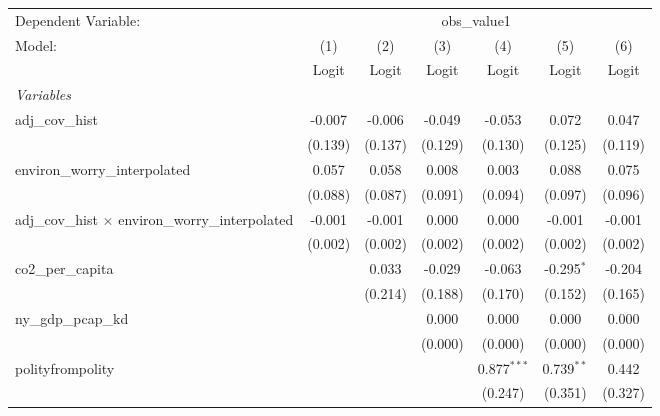 
\begingroup
\centering
\begin{tabular}{lcccccc}
   \toprule
   Dependent Variable: & \multicolumn{6}{c}{obs\_value1}\\
   Model:                                                    & (1)     & (2)     & (3)     & (4)           & (5)          & (6)\\  
                                                             &  Logit  & Logit   & Logit   & Logit         & Logit        & Logit\\  
   \midrule
   \emph{Variables}\\
   adj\_cov\_hist                                            & -0.007  & -0.006  & -0.049  & -0.053        & 0.072        & 0.047\\   
                                                             & (0.139) & (0.137) & (0.129) & (0.130)       & (0.125)      & (0.119)\\   
   environ\_worry\_interpolated                              & 0.057   & 0.058   & 0.008   & 0.003         & 0.088        & 0.075\\   
                                                             & (0.088) & (0.087) & (0.091) & (0.094)       & (0.097)      & (0.096)\\   
   adj\_cov\_hist $\times$ environ\_worry\_interpolated      & -0.001  & -0.001  & 0.000   & 0.000         & -0.001       & -0.001\\   
                                                             & (0.002) & (0.002) & (0.002) & (0.002)       & (0.002)      & (0.002)\\   
   co2\_per\_capita                                          &         & 0.033   & -0.029  & -0.063        & -0.295$^{*}$ & -0.204\\   
                                                             &         & (0.214) & (0.188) & (0.170)       & (0.152)      & (0.165)\\   
   ny\_gdp\_pcap\_kd                                         &         &         & 0.000   & 0.000         & 0.000        & 0.000\\   
                                                             &         &         & (0.000) & (0.000)       & (0.000)      & (0.000)\\   
   polityfrompolity                                          &         &         &         & 0.877$^{***}$ & 0.739$^{**}$ & 0.442\\   
                                                             &         &         &         & (0.247)       & (0.351)      & (0.327)\\   

\end{tabular}

